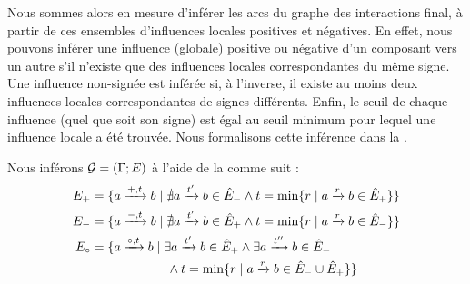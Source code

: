 Nous sommes alors en mesure d'inférer les arcs du graphe des interactions final,
à partir de ces ensembles d'influences locales positives et négatives.
En effet, nous pouvons inférer une influence (globale) positive ou négative
d'un composant vers un autre
s'il n'existe que des influences locales correspondantes du même signe.
Une influence non-signée est inférée si, à l'inverse, il existe au moins deux influences
locales correspondantes de signes différents.
Enfin, le seuil de chaque influence (quel que soit son signe)
est égal au seuil minimum pour lequel une influence locale a été trouvée.
Nous formalisons cette inférence dans la .

\begin{proposition}
  Nous inférons $\mathcal{G} = (\mathrm{\Gamma}; E)$ à l'aide de la  comme suit :
  \begin{align*}
    E_+ &= \{ a \xrightarrow{+, t} b \mid \nexists a \xrightarrow{t'} b \in \hat{E}_-
      \wedge t = \min \{ r \mid a \xrightarrow{r} b \in \hat{E}_+ \}\} \\
    E_- &= \{ a \xrightarrow{-, t} b \mid \nexists a \xrightarrow{t'} b \in \hat{E}_+
      \wedge t = \min \{ r \mid a \xrightarrow{r} b \in \hat{E}_- \}\} \\
    E_\circ &= \{ a \xrightarrow{\circ, t} b \mid \exists a \xrightarrow{t'} b \in \hat{E}_+ \wedge
      \exists a \xrightarrow{t''} b \in \hat{E}_- \\
      & \qquad\qquad\qquad \wedge t = \min \{ r \mid
      a \xrightarrow{r} b \in \hat{E}_- \cup \hat{E}_+ \} \}
  \end{align*}
\end{proposition}




